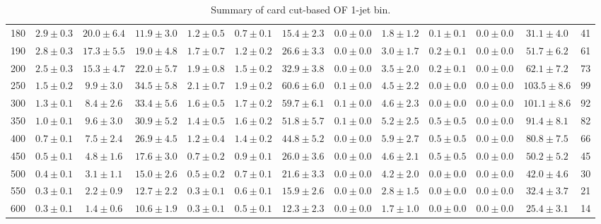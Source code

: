 \begin{table}
{\begin{center}
\begin{tabular}{l | c c | c c c c c c c c  | c c}
180 & $2.9\pm0.3$ & $20.0\pm6.4$ & $11.9\pm3.0$ & $1.2\pm0.5$ & $0.7\pm0.1$ & $15.4\pm2.3$ & $0.0\pm0.0$ & $1.8\pm1.2$ & $0.1\pm0.1$ & $0.0\pm0.0$ & $31.1\pm4.0$ & 41 \\
190 & $2.8\pm0.3$ & $17.3\pm5.5$ & $19.0\pm4.8$ & $1.7\pm0.7$ & $1.2\pm0.2$ & $26.6\pm3.3$ & $0.0\pm0.0$ & $3.0\pm1.7$ & $0.2\pm0.1$ & $0.0\pm0.0$ & $51.7\pm6.2$ & 61 \\
200 & $2.5\pm0.3$ & $15.3\pm4.7$ & $22.0\pm5.7$ & $1.9\pm0.8$ & $1.5\pm0.2$ & $32.9\pm3.8$ & $0.0\pm0.0$ & $3.5\pm2.0$ & $0.2\pm0.1$ & $0.0\pm0.0$ & $62.1\pm7.2$ & 73 \\
250 & $1.5\pm0.2$ & $9.9\pm3.0$ & $34.5\pm5.8$ & $2.1\pm0.7$ & $1.9\pm0.2$ & $60.6\pm6.0$ & $0.1\pm0.0$ & $4.5\pm2.2$ & $0.0\pm0.0$ & $0.0\pm0.0$ & $103.5\pm8.6$ & 99 \\
300 & $1.3\pm0.1$ & $8.4\pm2.6$ & $33.4\pm5.6$ & $1.6\pm0.5$ & $1.7\pm0.2$ & $59.7\pm6.1$ & $0.1\pm0.0$ & $4.6\pm2.3$ & $0.0\pm0.0$ & $0.0\pm0.0$ & $101.1\pm8.6$ & 92 \\
350 & $1.0\pm0.1$ & $9.6\pm3.0$ & $30.9\pm5.2$ & $1.4\pm0.5$ & $1.6\pm0.2$ & $51.8\pm5.7$ & $0.1\pm0.0$ & $5.2\pm2.5$ & $0.5\pm0.5$ & $0.0\pm0.0$ & $91.4\pm8.1$ & 82 \\
400 & $0.7\pm0.1$ & $7.5\pm2.4$ & $26.9\pm4.5$ & $1.2\pm0.4$ & $1.4\pm0.2$ & $44.8\pm5.2$ & $0.0\pm0.0$ & $5.9\pm2.7$ & $0.5\pm0.5$ & $0.0\pm0.0$ & $80.8\pm7.5$ & 66 \\
450 & $0.5\pm0.1$ & $4.8\pm1.6$ & $17.6\pm3.0$ & $0.7\pm0.2$ & $0.9\pm0.1$ & $26.0\pm3.6$ & $0.0\pm0.0$ & $4.6\pm2.1$ & $0.5\pm0.5$ & $0.0\pm0.0$ & $50.2\pm5.2$ & 45 \\
500 & $0.4\pm0.1$ & $3.1\pm1.1$ & $15.0\pm2.6$ & $0.5\pm0.2$ & $0.7\pm0.1$ & $21.6\pm3.3$ & $0.0\pm0.0$ & $4.2\pm2.0$ & $0.0\pm0.0$ & $0.0\pm0.0$ & $42.0\pm4.6$ & 30 \\
550 & $0.3\pm0.1$ & $2.2\pm0.9$ & $12.7\pm2.2$ & $0.3\pm0.1$ & $0.6\pm0.1$ & $15.9\pm2.6$ & $0.0\pm0.0$ & $2.8\pm1.5$ & $0.0\pm0.0$ & $0.0\pm0.0$ & $32.4\pm3.7$ & 21 \\
600 & $0.3\pm0.1$ & $1.4\pm0.6$ & $10.6\pm1.9$ & $0.3\pm0.1$ & $0.5\pm0.1$ & $12.3\pm2.3$ & $0.0\pm0.0$ & $1.7\pm1.0$ & $0.0\pm0.0$ & $0.0\pm0.0$ & $25.4\pm3.1$ & 14 \\
\hline
\end{tabular}
\end{center}
}
\caption{Summary of card cut-based OF 1-jet bin.}
\end{table}
